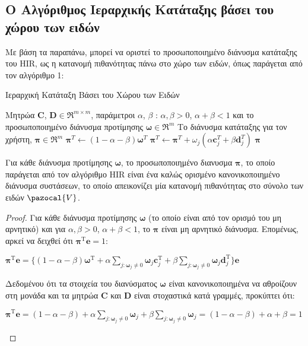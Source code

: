 \subsection{Ο Αλγόριθμος Ιεραρχικής Κατάταξης βάσει του χώρου των ειδών}
Με βάση τα παραπάνω, μπορεί να οριστεί το προσωποποιημένο διάνυσμα κατάταξης του {\en HIR}, ως η κατανομή πιθανότητας πάνω στο χώρο των ειδών, όπως παράγεται από τον αλγόριθμο 1:
\begin{algorithm}[ht]
  \caption{Ιεραρχική Κατάταξη Βάσει του Χώρου των Ειδών}\label{}
  \begin{algorithmic}[1]
    \Require Μητρώα $\mathbf{C}$, $\mathbf{D} \in \Re^{m\times m}$, παράμετροι $\alpha$, $\beta$ : $\alpha, \beta > 0$, $\alpha + \beta < 1$ και το προσωποποιημένο διάνυσμα προτίμησης $\boldsymbol{\omega}\in \Re^m$
    \Ensure Το διάνυσμα κατάταξης για τον χρήστη, $\boldsymbol{\pi}\in \Re^m$
    \medskip
    \State $\boldsymbol{\pi}^T \gets (1-\alpha - \beta)\boldsymbol{\omega}^T$
      \State $\boldsymbol{\pi}^T \gets \boldsymbol{\pi}^T + \omega_j(\alpha\mathbf{c}_{j}^{T} + \beta\mathbf{d}_{j}^{T})$
    \EndFor
    \State \Return $ \boldsymbol{\pi} $
  \end{algorithmic}
\end{algorithm}
\begin{theorem}
Για κάθε διάνυσμα προτίμησης $\boldsymbol{\omega}$, το προσωποποιημένο διανυσμα $\boldsymbol{\pi}$, το οποίο παράγεται από τον αλγόριθμο \en HIR \el είναι ένα καλώς ορισμένο κανονικοποιημένο διάνυσμα συστάσεων, το οποίο απεικονίζει μία κατανομή πιθανότητας στο σύνολο των ειδών $\pazocal{V}$.
\end{theorem}
\begin{proof}
Για κάθε διάνυσμα προτίμησης $\boldsymbol{\omega}$ (το οποίο είναι από τον ορισμό του μη αρνητικό) και για $\alpha, \beta > 0$, $\alpha+\beta<1$, το $\boldsymbol{\pi}$ είναι μη αρνητικό διάνυσμα. Επομένως, αρκεί να δειχθεί ότι $\boldsymbol{\pi}^{\text{T}}\mathbf{e} = 1$:
\begin{center}
$\boldsymbol{\pi}^{\text{T}}\mathbf{e} = \{ (1 - \alpha - \beta) \boldsymbol{\omega}^{\text{T}} + \alpha \sum\limits_{j:\boldsymbol{\omega}_j\neq 0} \boldsymbol{\omega}_j\mathbf{c}_j^{\text{T}} + \beta \sum\limits_{j:\boldsymbol{\omega}_j\neq 0} \boldsymbol{\omega}_j\mathbf{d}_j^{\text{T}}\}\mathbf{e}$
\end{center}
Δεδομένου ότι τα στοιχεία του διανύσματος $\boldsymbol{\omega}$ είναι κανονικοποιημένα να αθροί\-ζουν στη μονάδα και τα μητρώα $\mathbf{C}$ και $\mathbf{D}$ είναι στοχαστικά κατά γραμμές, προκύπτει ότι: 
\begin{center}
$\boldsymbol{\pi}^{\text{T}}\mathbf{e} = (1 - \alpha -\beta) + 
\alpha \sum\limits_{j:\boldsymbol{\omega}_j\neq 0} \boldsymbol{\omega}_j + \beta \sum\limits_{j:\boldsymbol{\omega}_j\neq 0} \boldsymbol{\omega}_j = (1 - \alpha -\beta) + \alpha + \beta = 1 $
\end{center}
\end{proof}
